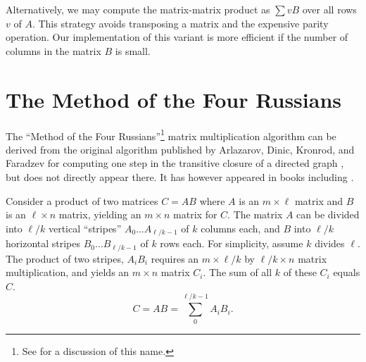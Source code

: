 Alternatively, we may compute the matrix-matrix product as $\sum vB$ over all rows $v$ of $A$. This strategy avoids transposing a matrix and the expensive parity operation. Our implementation of this variant is more efficient if the number of columns in the matrix $B$ is small.

\section{The Method of the Four Russians}
\label{sec:m4rm}
The ``Method of the Four Russians''\footnote{See \cite{linearmap2} for a discussion of this name.} matrix multiplication algorithm can be derived from the original algorithm published by Arlazarov, Dinic, Kronrod, and Faradzev for computing one step in the transitive closure of a directed graph \cite{ADKF70}, but does not directly appear there. It has however appeared in books including \cite[Ch. 6]{AHU74}.

Consider a product of two matrices $C = AB$ where $A$ is an $m \times \ell$ matrix and $B$ is an $\ell \times n$ matrix, yielding an $m \times n$ matrix for $C$. The matrix $A$ can be divided into $\ell/k$ vertical ``stripes'' $A_0 \dots A_{\ell/k-1}$ of $k$ columns each, and $B$ into $\ell/k$ horizontal stripes
$B_0 \dots B_{\ell/k-1}$ of $k$ rows each. For simplicity, assume $k$ divides $\ell$. The product of two stripes, $A_i B_i$ requires an $m \times \ell/k$ by $\ell/k \times n$ matrix multiplication, and yields an $m \times n$ matrix $C_i$. The sum of all $k$ of these $C_i$ equals $C$.
\[
C = AB = \sum_0^{\ell/k-1} A_iB_i. 
\]


